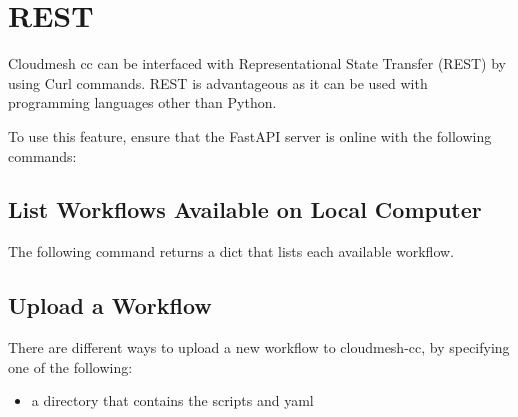 \hypertarget{rest}{%
\section{REST}\label{rest}}

Cloudmesh cc can be interfaced with Representational State Transfer
(REST) by using Curl commands. REST is advantageous as it can be used
with programming languages other than Python.

To use this feature, ensure that the FastAPI server is online with the
following commands:

\begin{Shaded}
\begin{Highlighting}[]
\end{Highlighting}
\end{Shaded}

\hypertarget{list-workflows-available-on-local-computer}{%
\subsection{List Workflows Available on Local
Computer}\label{list-workflows-available-on-local-computer}}

The following command returns a dict that lists each available workflow.

\begin{Shaded}
\begin{Highlighting}[]
   \DataTypeTok{\textbackslash{}}
     \DataTypeTok{\textbackslash{}}
     
\end{Highlighting}
\end{Shaded}

\hypertarget{upload-a-workflow}{%
\subsection{Upload a Workflow}\label{upload-a-workflow}}

There are different ways to upload a new workflow to cloudmesh-cc, by
specifying one of the following:

\begin{itemize}
\tightlist
\item
  a directory that contains the scripts and yaml
\end{itemize}

